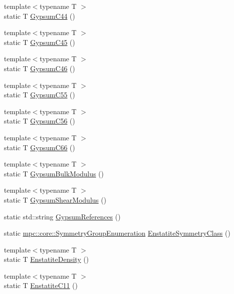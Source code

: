 \begin{DoxyCompactItemize}
\item 
{\footnotesize template$<$typename T $>$ }\\static T \mbox{\hyperlink{namespacempc_1_1data_ac2e8cd21f63133e4f28600baa0432bad}{Gypsum\+C44}} ()
\item 
{\footnotesize template$<$typename T $>$ }\\static T \mbox{\hyperlink{namespacempc_1_1data_a7ef38f03377325d2807d507ab337f0bd}{Gypsum\+C45}} ()
\item 
{\footnotesize template$<$typename T $>$ }\\static T \mbox{\hyperlink{namespacempc_1_1data_a6d5ff15e0397a0c2894602d0ddf08417}{Gypsum\+C46}} ()
\item 
{\footnotesize template$<$typename T $>$ }\\static T \mbox{\hyperlink{namespacempc_1_1data_aecb7459942150506e0f2bfa8455ce270}{Gypsum\+C55}} ()
\item 
{\footnotesize template$<$typename T $>$ }\\static T \mbox{\hyperlink{namespacempc_1_1data_ae5ec0ac20cc68eea6e971adf0bc7f6c5}{Gypsum\+C56}} ()
\item 
{\footnotesize template$<$typename T $>$ }\\static T \mbox{\hyperlink{namespacempc_1_1data_a62f9e55b7c7597ba3c377061e4cfd7da}{Gypsum\+C66}} ()
\item 
{\footnotesize template$<$typename T $>$ }\\static T \mbox{\hyperlink{namespacempc_1_1data_a353d25ef0cef4ba4da0fcb65cc6837fe}{Gypsum\+Bulk\+Modulus}} ()
\item 
{\footnotesize template$<$typename T $>$ }\\static T \mbox{\hyperlink{namespacempc_1_1data_a41cf4ad737e4f3d91615f4d821581cde}{Gypsum\+Shear\+Modulus}} ()
\item 
static std\+::string \mbox{\hyperlink{namespacempc_1_1data_aaabd788c6e1ba85f61073820a781d728}{Gypsum\+References}} ()
\item 
static \mbox{\hyperlink{namespacempc_1_1core_a9d979684062547055a0ef5c13077bad8}{mpc\+::core\+::\+Symmetry\+Group\+Enumeration}} \mbox{\hyperlink{namespacempc_1_1data_a61795bd4708c7d51b3871220c838eafd}{Enstatite\+Symmetry\+Class}} ()
\item 
{\footnotesize template$<$typename T $>$ }\\static T \mbox{\hyperlink{namespacempc_1_1data_ab8b786f26e65861726f33131c27c48c7}{Enstatite\+Density}} ()
\item 
{\footnotesize template$<$typename T $>$ }\\static T \mbox{\hyperlink{namespacempc_1_1data_a815297f57c9e3ddbeb67f22fea054cc5}{Enstatite\+C11}} ()

\end{DoxyCompactItemize}
